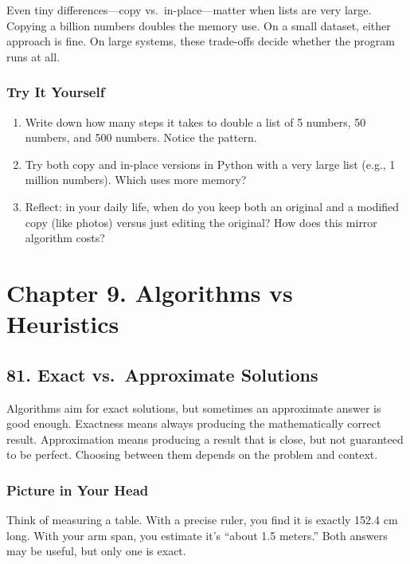 \documentclass[
  letterpaper,
  DIV=11,
  numbers=noendperiod]{scrreprt}
\providecommand{\tightlist}{%
  \setlength{\itemsep}{0pt}\setlength{\parskip}{0pt}}
\begin{document}
Even tiny differences---copy vs.~in-place---matter when lists are very
large. Copying a billion numbers doubles the memory use. On a small
dataset, either approach is fine. On large systems, these trade-offs
decide whether the program runs at all.

\subsubsection{Try It Yourself}\label{try-it-yourself-80}

\begin{enumerate}
\def\labelenumi{\arabic{enumi}.}
\tightlist
\item
  Write down how many steps it takes to double a list of 5 numbers, 50
  numbers, and 500 numbers. Notice the pattern.
\item
  Try both copy and in-place versions in Python with a very large list
  (e.g., 1 million numbers). Which uses more memory?
\item
  Reflect: in your daily life, when do you keep both an original and a
  modified copy (like photos) versus just editing the original? How does
  this mirror algorithm costs?
\end{enumerate}

\section{Chapter 9. Algorithms vs
Heuristics}\label{chapter-9.-algorithms-vs-heuristics}

\subsection{81. Exact vs.~Approximate
Solutions}\label{exact-vs.-approximate-solutions}

Algorithms aim for exact solutions, but sometimes an approximate answer
is good enough. Exactness means always producing the mathematically
correct result. Approximation means producing a result that is close,
but not guaranteed to be perfect. Choosing between them depends on the
problem and context.

\subsubsection{Picture in Your Head}\label{picture-in-your-head-81}

Think of measuring a table. With a precise ruler, you find it is exactly
152.4 cm long. With your arm span, you estimate it's ``about 1.5
meters.'' Both answers may be useful, but only one is exact.
\end{document}
